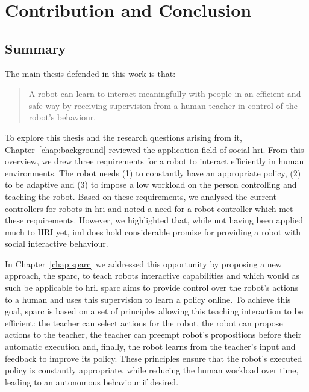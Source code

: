 \chapter{Contribution and Conclusion} \label{chap:conclusion}
\glsresetall



\section{Summary}\label{sec:conc_summary}

The main thesis defended in this work is that: 
\begin{quote}
	A robot can learn to interact meaningfully with people in an efficient and safe way by receiving supervision from a human teacher in control of the robot's behaviour. 
\end{quote}

To explore this thesis and the research questions arising from it, Chapter~\ref{chap:background}  reviewed the application field of social \gls{hri}. From this overview, we drew three requirements for a robot to interact efficiently in human environments. The robot needs (1) to constantly have an appropriate policy, (2) to be adaptive and (3) to impose a low workload on the person controlling and teaching the robot. Based on these requirements, we analysed the current controllers for robots in \gls{hri} and noted a need for a robot controller which met these requirements. However, we highlighted that, while not having been applied much to HRI yet, \gls{iml} does hold considerable promise for providing a robot with social interactive behaviour.

In Chapter~\ref{chap:sparc} we addressed this opportunity by proposing a new approach, the \gls{sparc}, to teach robots interactive capabilities and which would as such be applicable to \gls{hri}. \gls{sparc} aims to provide control over the robot's actions to a human and uses this supervision to learn a policy online. To achieve this goal, \gls{sparc} is based on a set of principles allowing this teaching interaction to be efficient: the teacher can select actions for the robot, the robot can propose actions to the teacher, the teacher can preempt robot's propositions before their automatic execution and, finally, the robot learns from the teacher's input and feedback to improve its policy. These principles ensure that the robot's executed policy is constantly appropriate, while reducing the human workload over time, leading to an autonomous behaviour if desired.

